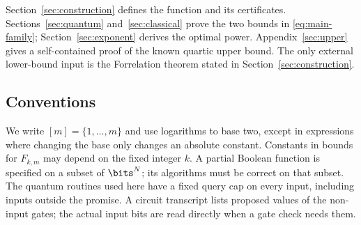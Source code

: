 Section~\ref{sec:construction} defines the function and its certificates.
Sections~\ref{sec:quantum} and~\ref{sec:classical} prove the two bounds in
\eqref{eq:main-family}; Section~\ref{sec:exponent} derives the optimal
power. Appendix~\ref{sec:upper} gives a self-contained proof of the known
quartic upper bound. The only external lower-bound input is the
Forrelation theorem stated in Section~\ref{sec:construction}.

\subsection{Conventions}

We write $[m]=\{1,\ldots,m\}$ and use logarithms to base two, except in
expressions where changing the base only changes an absolute constant.
Constants in bounds for $F_{k,m}$ may depend on the fixed integer $k$.
A partial Boolean function is specified on a subset of $\bits^N$;
its algorithms must be correct on that subset. The quantum routines used
here have a fixed query cap on every input, including inputs outside the
promise. A circuit transcript lists proposed values of the non-input
gates; the actual input bits are read directly when a gate check needs them.

